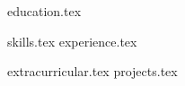 \documentclass[letterpaper,11pt]{article}
\begin{document}


{education.tex}


%    


    

{skills.tex}
{experience.tex}

{extracurricular.tex}
{projects.tex}
\end{document}
